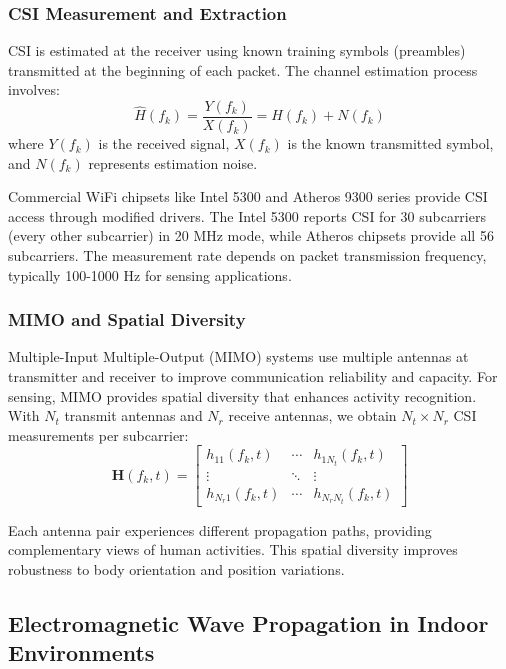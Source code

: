 \documentclass[10pt,journal,compsoc]{IEEEtran}
\begin{document}
\subsubsection{CSI Measurement and Extraction}

CSI is estimated at the receiver using known training symbols (preambles) transmitted at the beginning of each packet. The channel estimation process involves:
\begin{equation}
\hat{H}(f_k) = \frac{Y(f_k)}{X(f_k)} = H(f_k) + N(f_k)
\end{equation}
where $Y(f_k)$ is the received signal, $X(f_k)$ is the known transmitted symbol, and $N(f_k)$ represents estimation noise.

Commercial WiFi chipsets like Intel 5300 and Atheros 9300 series provide CSI access through modified drivers. The Intel 5300 reports CSI for 30 subcarriers (every other subcarrier) in 20 MHz mode, while Atheros chipsets provide all 56 subcarriers. The measurement rate depends on packet transmission frequency, typically 100-1000 Hz for sensing applications.

\subsubsection{MIMO and Spatial Diversity}

Multiple-Input Multiple-Output (MIMO) systems use multiple antennas at transmitter and receiver to improve communication reliability and capacity. For sensing, MIMO provides spatial diversity that enhances activity recognition. With $N_t$ transmit antennas and $N_r$ receive antennas, we obtain $N_t \times N_r$ CSI measurements per subcarrier:
\begin{equation}
\mathbf{H}(f_k, t) = \begin{bmatrix}
h_{11}(f_k, t) & \cdots & h_{1N_t}(f_k, t) \\
\vdots & \ddots & \vdots \\
h_{N_r1}(f_k, t) & \cdots & h_{N_rN_t}(f_k, t)
\end{bmatrix}
\end{equation}

Each antenna pair experiences different propagation paths, providing complementary views of human activities. This spatial diversity improves robustness to body orientation and position variations.

\subsection{Electromagnetic Wave Propagation in Indoor Environments}
\end{document}

